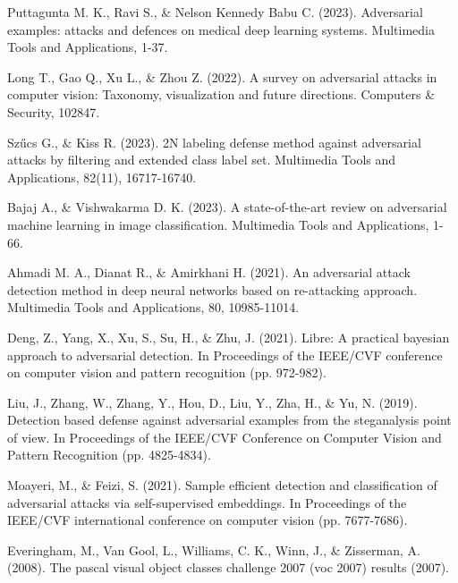\begin{thebibliography}{}
Puttagunta M. K., Ravi S., \& Nelson Kennedy Babu C. (2023). Adversarial examples: attacks and defences on medical deep learning systems. Multimedia Tools and Applications, 1-37.

Long T., Gao Q., Xu L., \& Zhou Z. (2022). A survey on adversarial attacks in computer vision: Taxonomy, visualization and future directions. Computers \& Security, 102847.


Szűcs G., \& Kiss R. (2023). 2N labeling defense method against adversarial attacks by filtering and extended class label set. Multimedia Tools and Applications, 82(11), 16717-16740.

Bajaj A., \& Vishwakarma D. K. (2023). A state-of-the-art review on adversarial machine learning in image classification. Multimedia Tools and Applications, 1-66.

Ahmadi M. A., Dianat R., \& Amirkhani H. (2021). An adversarial attack detection method in deep neural networks based on re-attacking approach. Multimedia Tools and Applications, 80, 10985-11014.

 Deng, Z., Yang, X., Xu, S., Su, H., \& Zhu, J. (2021). Libre: A practical bayesian approach to adversarial detection. In Proceedings of the IEEE/CVF conference on computer vision and pattern recognition (pp. 972-982).

 Liu, J., Zhang, W., Zhang, Y., Hou, D., Liu, Y., Zha, H., \& Yu, N. (2019). Detection based defense against adversarial examples from the steganalysis point of view. In Proceedings of the IEEE/CVF Conference on Computer Vision and Pattern Recognition (pp. 4825-4834).

 Moayeri, M., \& Feizi, S. (2021). Sample efficient detection and classification of adversarial attacks via self-supervised embeddings. In Proceedings of the IEEE/CVF international conference on computer vision (pp. 7677-7686).

Everingham, M., Van Gool, L., Williams, C. K., Winn, J., \& Zisserman, A. (2008). The pascal visual object classes challenge 2007 (voc 2007) results (2007).

\end{thebibliography}


